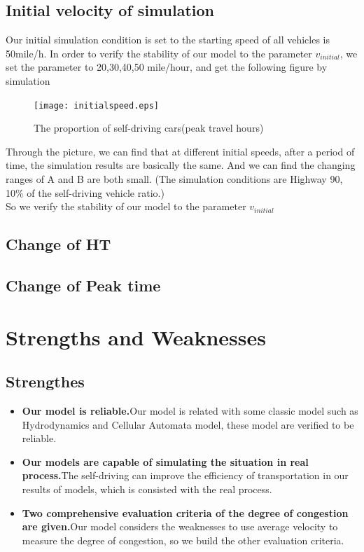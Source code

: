\documentclass{mcmthesis}
\begin{document}
\subsection{Initial velocity of simulation}
\indent Our initial simulation condition is set to the starting speed of all vehicles is 50mile/h. In order to verify the stability of our model to the parameter $v_{initial}$, we set the parameter to 20,30,40,50 mile/hour, and get the following figure by simulation
\begin{figure}[H]
	\centerline{\texttt{[image: initialspeed.eps]}}
	\caption{The proportion of self-driving cars(peak travel hours)}	
\end{figure}
\indent Through the picture, we can find that at different initial speeds, after a period of time, the simulation results are basically the same. And we can find the changing ranges of A and B are both small. (The simulation conditions are Highway 90, 10\% of the self-driving vehicle ratio.)\\
\indent So we verify the stability of our model to the parameter $v_{initial}$
\subsection{Change of HT}

\subsection{Change of Peak time}

\section{Strengths and Weaknesses}
\subsection{Strengthes}
\begin{itemize}
\item{\textbf{Our model is reliable.}Our model is related with some classic model such as Hydrodynamics and Cellular Automata model, these model are verified to be reliable.}
\end{itemize}
\begin{itemize}
\item{\textbf{Our models are capable of simulating the situation in real process.}The self-driving can improve the efficiency of transportation in our results of models, which is consisted with the real process.}
\end{itemize}
\begin{itemize}
\item{\textbf{Two comprehensive evaluation criteria of the degree of congestion are given.}Our model considers the weaknesses to use average velocity to measure the degree of congestion, so we build the other evaluation criteria.}
\end{itemize}
\end{document}
